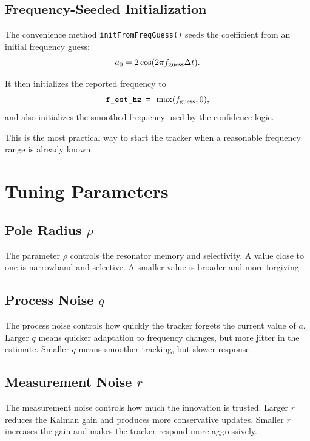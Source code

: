 \documentclass[conference]{IEEEtran}
\begin{document}
\subsection{Frequency-Seeded Initialization}

The convenience method \texttt{initFromFreqGuess()} seeds the coefficient from
an initial frequency guess:
\begin{equation}
  a_0 = 2\cos(2\pi f_{\rm guess}\Delta t).
\end{equation}

It then initializes the reported frequency to
\begin{equation}
  \texttt{f\_est\_hz = } \max(f_{\rm guess},0),
\end{equation}
and also initializes the smoothed frequency used by the confidence logic.

This is the most practical way to start the tracker when a reasonable
frequency range is already known.

\section{Tuning Parameters}\label{sec:tuning}

\subsection{Pole Radius $\rho$}

The parameter $\rho$ controls the resonator memory and selectivity.
A value close to one is narrowband and selective. A smaller value is broader
and more forgiving.

\subsection{Process Noise $q$}

The process noise controls how quickly the tracker forgets the current value
of $a$. Larger $q$ means quicker adaptation to frequency changes, but more
jitter in the estimate. Smaller $q$ means smoother tracking, but slower
response.

\subsection{Measurement Noise $r$}

The measurement noise controls how much the innovation is trusted.
Larger $r$ reduces the Kalman gain and produces more conservative updates.
Smaller $r$ increases the gain and makes the tracker respond more aggressively.
\end{document}
